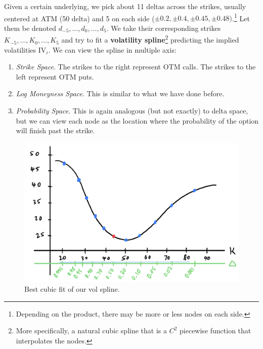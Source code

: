\documentclass{article}
\begin{document}
    \begin{definition}
      Given a certain underlying, we pick about 11 deltas across the strikes, usually centered at ATM (50 delta) and 5 on each side ($\pm 0.2, \pm 0.4, \pm 0.45, \pm 0.48)$.\footnote{Depending on the product, there may be more or less nodes on each side.} Let them be denoted $d_{-5}, \ldots, d_0, \ldots, d_5$. We take their corresponding strikes $K_{-5}, \ldots, K_0, \ldots, K_5$ and try to fit a \textbf{volatility spline}\footnote{More specifically, a natural cubic spline that is a $C^2$ piecewise function that interpolates the nodes.} predicting the implied volatilities $\mathrm{IV}_{i}$. We can view the spline in multiple axis: 
      \begin{enumerate}
        \item \textit{Strike Space}. The strikes to the right represent OTM calls. The strikes to the left represent OTM puts. 
        \item \textit{Log Moneyness Space}. This is similar to what we have done before. 
        \item \textit{Probability Space}. This is again analogous (but not exactly) to delta space, but we can view each node as the location where the probability of the option will finish past the strike.  
      \end{enumerate}
      
      \begin{figure}[H]
        \centering 
        \includegraphics[scale=0.4]{img/vol_spline.png}
        \caption{Best cubic fit of our vol spline.} 
        \label{fig:vol_spline}
      \end{figure}
    \end{definition} 
\end{document}
